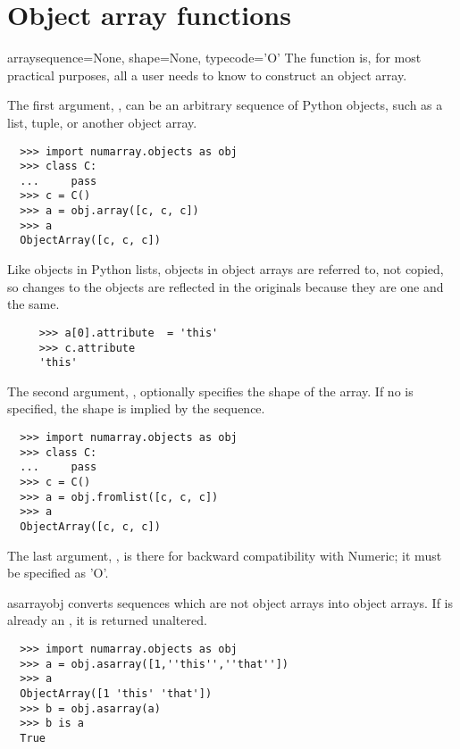 \section{Object array functions}
\label{sec:objectarray-func}
\begin{funcdesc}{array}{sequence=None, shape=None, typecode='O'}
\label{func:obj.array}
   The function  is, for most practical purposes, all a user needs 
   to know to construct an object array.

   The first argument, , can be an arbitrary sequence of Python
   objects, such as a list, tuple, or another object array.  

\begin{verbatim}
  >>> import numarray.objects as obj
  >>> class C:
  ...     pass
  >>> c = C()
  >>> a = obj.array([c, c, c])
  >>> a
  ObjectArray([c, c, c])
\end{verbatim}
   
   Like objects in Python lists, objects in object arrays are referred to, not
   copied, so changes to the objects are reflected in the originals because
   they are one and the same.

\begin{verbatim}
     >>> a[0].attribute  = 'this'
     >>> c.attribute
     'this'
\end{verbatim}
   
   The second argument, , optionally specifies the shape of the
   array.  If no  is specified, the shape is implied by the
   sequence.

\begin{verbatim}
  >>> import numarray.objects as obj
  >>> class C:
  ...     pass
  >>> c = C()
  >>> a = obj.fromlist([c, c, c])
  >>> a
  ObjectArray([c, c, c])
\end{verbatim}
   
   The last argument, , is there for backward compatibility with
   Numeric; it must be specified as 'O'.

\end{funcdesc}
   
\begin{funcdesc}{asarray}{obj}
  \label{func:obj.asarray}
   converts sequences which are not object arrays into object
  arrays.  If  is already an , it is returned
  unaltered.
\begin{verbatim}
  >>> import numarray.objects as obj
  >>> a = obj.asarray([1,''this'',''that''])
  >>> a
  ObjectArray([1 'this' 'that'])
  >>> b = obj.asarray(a)
  >>> b is a
  True
\end{verbatim}
\end{funcdesc}

